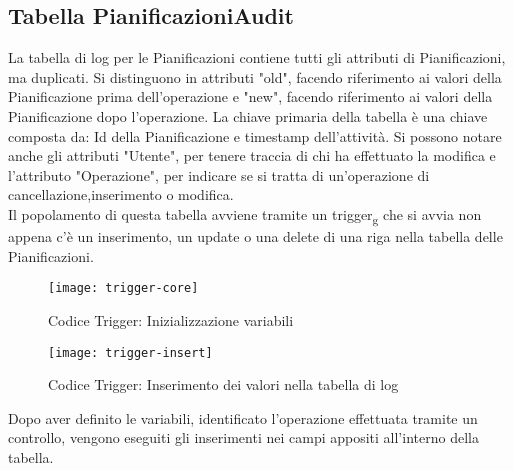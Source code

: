 \subsection{Tabella PianificazioniAudit}
La tabella di log per le Pianificazioni contiene tutti gli attributi di Pianificazioni, ma duplicati. Si distinguono in attributi "old", facendo riferimento ai valori della Pianificazione prima dell'operazione e "new", facendo riferimento ai valori della Pianificazione dopo l'operazione. La chiave primaria della tabella è una chiave composta da: Id della Pianificazione e timestamp dell'attività. Si possono notare anche gli attributi "Utente", per tenere traccia di chi ha effettuato la modifica e l'attributo "Operazione", per indicare se si tratta di un'operazione di cancellazione,inserimento o modifica.\\

\noindent Il popolamento di questa tabella avviene tramite un trigger\textsubscript{g} che si avvia non appena c'è un inserimento, un update o una delete di una riga nella tabella delle Pianificazioni.
\begin{figure}[H] 
    \centering 
    \texttt{[image: trigger-core]} 
    \caption{Codice Trigger: Inizializzazione variabili}
\end{figure}

\begin{figure}[H] 
    \centering 
    \texttt{[image: trigger-insert]} 
    \caption{Codice Trigger: Inserimento dei valori nella tabella di log}
\end{figure}
\noindent Dopo aver definito le variabili, identificato l'operazione effettuata tramite un controllo, vengono eseguiti gli inserimenti nei campi appositi all'interno della tabella.


